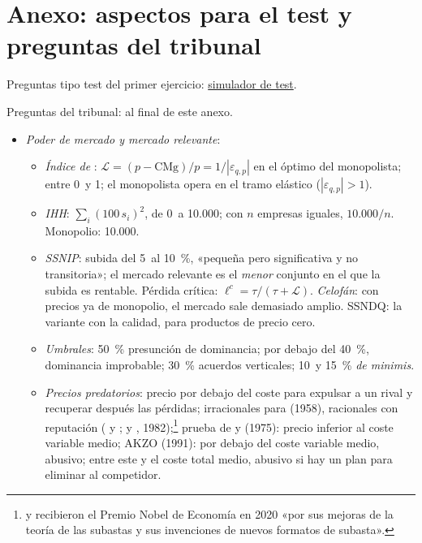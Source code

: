 \documentclass[11pt]{article}
\begin{document}
\section{Anexo: aspectos para el test y preguntas del tribunal}\label{anexo:test}

\begin{anotaciones}
Preguntas tipo test del primer ejercicio: \href{https://www.victorgutierrezmarcos.es/oposicion/temario/primer-ejercicio/test/simulador.html?tema=3.A.20}{simulador de test}.

Preguntas del tribunal: al final de este anexo.
\end{anotaciones}

\begin{itemize}
\item \emph{Poder de mercado y mercado relevante}:
  \begin{itemize}
  \item \emph{Índice de }: $\mathcal{L}=(p-\mathrm{CMg})/p=1/|\varepsilon_{q,p}|$ en el óptimo del monopolista; entre 0~y 1; el monopolista opera en el tramo elástico ($|\varepsilon_{q,p}|>1$).
  \item \emph{IHH}: $\sum_i(100\,s_i)^2$, de 0~a 10.000; con $n$ empresas iguales, $10.000/n$. Monopolio: 10.000.
  \item \emph{SSNIP}: subida del 5~al 10~\%, «pequeña pero significativa y no transitoria»; el mercado relevante es el \emph{menor} conjunto en el que la subida es rentable. Pérdida crítica: $\ell^{c}=\tau/(\tau+\mathcal{L})$. \emph{Celofán}: con precios ya de monopolio, el mercado sale demasiado amplio. SSNDQ: la variante con la calidad, para productos de precio cero.
  \item \emph{Umbrales}: 50~\% presunción de dominancia\nocite{TJUE1991AKZO}; por debajo del 40~\%, dominancia improbable\nocite{CE2026DirectricesExclusion}; 30~\% acuerdos verticales\nocite{UE2022RECAV}; 10~y 15~\% \emph{de minimis}\nocite{CE2014DeMinimis}.
  \item \emph{Precios predatorios}: precio por debajo del coste para expulsar a un rival y recuperar después las pérdidas; irracionales para  (1958), racionales con reputación ( y ;  y , 1982);\footnote{ y  recibieron el Premio Nobel de Economía en 2020 «por sus mejoras de la teoría de las subastas y sus invenciones de nuevos formatos de subasta»\nocite{Nobel2020MilgromWilson}.} prueba de  y  (1975): precio inferior al coste variable medio; AKZO (1991): por debajo del coste variable medio, abusivo; entre este y el coste total medio, abusivo si hay un plan para eliminar al competidor\nocite{TJUE1991AKZO}.

\end{itemize}
\end{itemize}
\end{document}
